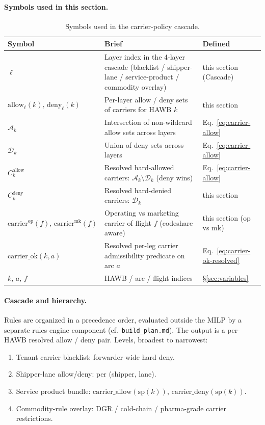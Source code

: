 \documentclass[11pt,a4paper]{article}
\theoremstyle{definition}
\begin{document}
\paragraph{Symbols used in this section.}
\begin{table}[H]
\centering
\caption{Symbols used in the carrier-policy cascade.}
\label{tab:carrier-policy-syms}
\begin{tabular}{lp{9cm}p{3.5cm}}
\toprule
Symbol & Brief & Defined \\
\midrule
$\ell$ & Layer index in the 4-layer cascade (blacklist / shipper-lane / service-product / commodity overlay) & this section (Cascade) \\
$\text{allow}_\ell(k),\, \text{deny}_\ell(k)$ & Per-layer allow / deny sets of carriers for HAWB $k$ & this section \\
$\mathcal{A}_k$ & Intersection of non-wildcard allow sets across layers & Eq.~\ref{eq:carrier-allow} \\
$\mathcal{D}_k$ & Union of deny sets across layers & Eq.~\ref{eq:carrier-allow} \\
$C_k^{\text{allow}}$ & Resolved hard-allowed carriers: $\mathcal{A}_k \setminus \mathcal{D}_k$ (deny wins) & Eq.~\ref{eq:carrier-allow} \\
$C_k^{\text{deny}}$ & Resolved hard-denied carriers: $\mathcal{D}_k$ & this section \\
$\text{carrier}^{\text{op}}(f),\, \text{carrier}^{\text{mk}}(f)$ & Operating vs marketing carrier of flight $f$ (codeshare aware) & this section (op vs mk) \\
$\text{carrier\_ok}(k, a)$ & Resolved per-leg carrier admissibility predicate on arc $a$ & Eq.~\ref{eq:carrier-ok-resolved} \\
$k,\, a,\, f$ & HAWB / arc / flight indices & \S\ref{sec:variables} \\
\bottomrule
\end{tabular}
\end{table}

\paragraph{Cascade and hierarchy.}
Rules are organized in a precedence order, evaluated outside the MILP by a
separate rules-engine component (cf.\ \texttt{build\_plan.md}). The output is
a per-HAWB resolved allow / deny pair. Levels, broadest to narrowest:
\begin{enumerate}[noitemsep]
  \item Tenant carrier blacklist: forwarder-wide hard deny.
  \item Shipper-lane allow/deny: per (shipper, lane).
  \item Service product bundle: $\text{carrier\_allow}(\text{sp}(k))$,
        $\text{carrier\_deny}(\text{sp}(k))$.
  \item Commodity-rule overlay: DGR / cold-chain / pharma-grade carrier
        restrictions.
\end{enumerate}
\end{document}
